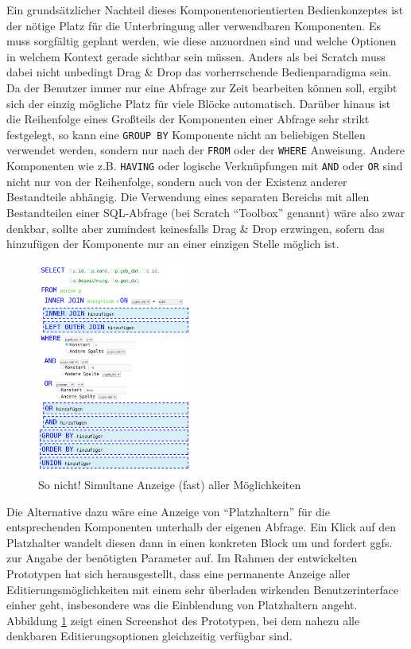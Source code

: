 Ein grundsätzlicher Nachteil dieses Komponentenorientierten Bedienkonzeptes ist der nötige Platz für die Unterbringung aller verwendbaren Komponenten. Es muss sorgfältig geplant werden, wie diese anzuordnen sind und welche Optionen in welchem Kontext gerade sichtbar sein müssen. Anders als bei Scratch muss dabei nicht unbedingt Drag \& Drop das vorherrschende Bedienparadigma sein. Da der Benutzer immer nur eine Abfrage zur Zeit bearbeiten können soll, ergibt sich der einzig mögliche Platz für viele Blöcke automatisch. Darüber hinaus ist die Reihenfolge eines Großteils der Komponenten einer Abfrage sehr strikt festgelegt, so kann eine \texttt{GROUP BY} Komponente nicht an beliebigen Stellen verwendet werden, sondern nur nach der \texttt{FROM} oder der \texttt{WHERE} Anweisung. Andere Komponenten wie z.B. \texttt{HAVING} oder logische Verknüpfungen mit \texttt{AND} oder \texttt{OR} sind nicht nur von der Reihenfolge, sondern auch von der Existenz anderer Bestandteile abhängig. Die Verwendung eines separaten Bereichs mit allen Bestandteilen einer SQL-Abfrage (bei Scratch ``Toolbox'' genannt) wäre also zwar denkbar, sollte aber zumindest keinesfalls Drag \& Drop erzwingen, sofern das hinzufügen der Komponente nur an einer einzigen Stelle möglich ist.

\begin{figure}
  \includegraphics[width=0.45\textwidth]{images/sql-sketch-all-editing}
  \caption{So nicht! Simultane Anzeige (fast) aller Möglichkeiten}
  \label{fig:screen-sql-editor-all-editing}
\end{figure}

Die Alternative dazu wäre eine Anzeige von ``Platzhaltern'' für die entsprechenden Komponenten unterhalb der eigenen Abfrage. Ein Klick auf den Platzhalter wandelt diesen dann in einen konkreten Block um und fordert ggfs. zur Angabe der benötigten Parameter auf. Im Rahmen der entwickelten Prototypen hat sich herausgestellt, dass eine permanente Anzeige aller Editierungsmöglichkeiten mit einem sehr überladen wirkenden Benutzerinterface einher geht, insbesondere was die Einblendung von Platzhaltern angeht. Abbildung \ref{fig:screen-sql-editor-all-editing} zeigt einen Screenshot des Prototypen, bei dem nahezu alle denkbaren Editierungsoptionen gleichzeitig verfügbar sind.

